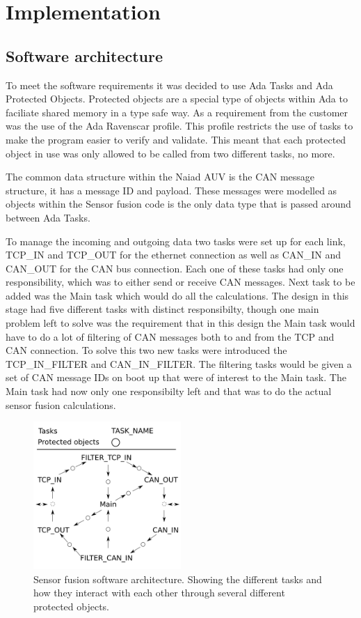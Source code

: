\section{Implementation}\label{sec:implementation}
\subsection{Software architecture}
To meet the software requirements it was decided to use Ada Tasks and Ada
Protected Objects. Protected objects are a special type of objects within Ada
to faciliate shared memory in a type safe way. As a requirement from the
customer was the use of the Ada Ravenscar profile. This profile restricts
the use of tasks to make the program easier to verify and validate. This meant
that each protected object in use was only allowed to be called from two
different tasks, no more.

The common data structure within the Naiad AUV is the CAN message structure,
it has a message ID and payload. These messages were modelled as objects within
the Sensor fusion code is the only data type that is passed around between
Ada Tasks.

To manage the incoming and outgoing data two tasks were set up for each link,
TCP\_IN and TCP\_OUT for the ethernet connection as well as CAN\_IN and CAN\_OUT for
the CAN bus connection. Each one of these tasks had only one responsibility, which
was to either send or receive CAN messages. Next task to be added was the Main
task which would do all the calculations. The design in this stage had five
different tasks with distinct responsibilty, though one main problem left to solve
was the requirement that in this design the Main task would have to do a lot of
filtering of CAN messages both to and from the TCP and CAN connection. To solve this
two new tasks were introduced the TCP\_IN\_FILTER and CAN\_IN\_FILTER. The filtering
tasks would be given a set of CAN message IDs on boot up that were of interest to
the Main task. The Main task had now only one responsibilty left and that was
to do the actual sensor fusion calculations.

\begin{figure}[ht]
    \includegraphics[width=0.5\textwidth]{./figure/software_architecture.png}
    \caption{Sensor fusion software architecture. Showing the different tasks and
    how they interact with each other through several different protected objects.}
    \label{fig:software_architecture}
\end{figure}

